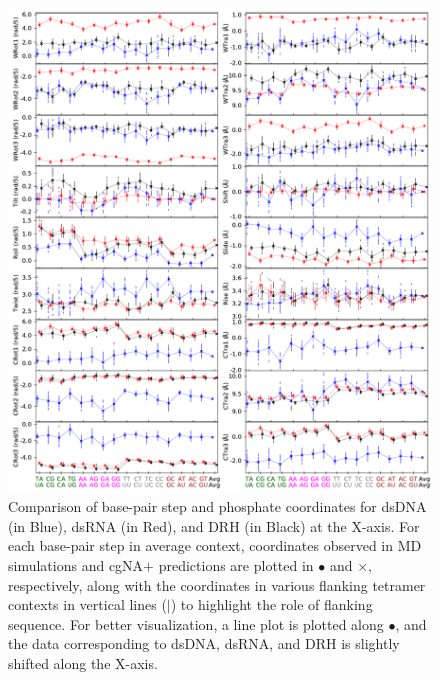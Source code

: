 \begin{figure}[p]
\begin{center}
 \centering\includegraphics[width=14.9cm,trim=0cm 0.7cm 0cm 0cm]{images/compare_dim_gs_DNA_RNA_HYB_gs.pdf}
\end{center}
\centering\caption{
Comparison of base-pair step and phosphate coordinates for dsDNA (in Blue), dsRNA (in Red), and DRH (in Black) at the X-axis. For each base-pair step in average context, coordinates observed in MD simulations and cgNA$+$ predictions are plotted in $\bullet$ and $\times$, respectively, along with the coordinates in various flanking tetramer contexts in vertical lines ($|$) to highlight the role of flanking sequence.
For better visualization, a line plot is plotted along $\bullet$, and the data corresponding to dsDNA, dsRNA, and DRH is slightly shifted along the X-axis.
}
\label{c4:fig4_dimercomp}
\end{figure}  
\clearpage




